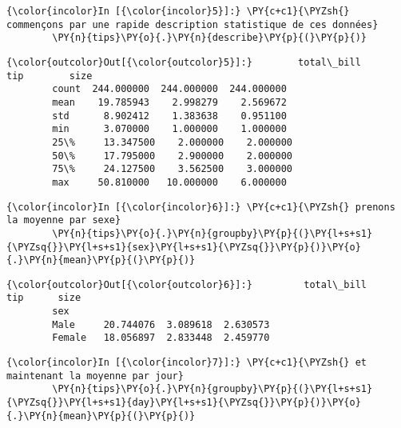     \begin{Verbatim}[commandchars=\\\{\},frame=single,framerule=0.3mm,rulecolor=\color{cellframecolor}]
{\color{incolor}In [{\color{incolor}5}]:} \PY{c+c1}{\PYZsh{} commençons par une rapide description statistique de ces données}
        \PY{n}{tips}\PY{o}{.}\PY{n}{describe}\PY{p}{(}\PY{p}{)}
\end{Verbatim}


\begin{Verbatim}[commandchars=\\\{\},frame=single,framerule=0.3mm,rulecolor=\color{cellframecolor}]
{\color{outcolor}Out[{\color{outcolor}5}]:}        total\_bill         tip        size
        count  244.000000  244.000000  244.000000
        mean    19.785943    2.998279    2.569672
        std      8.902412    1.383638    0.951100
        min      3.070000    1.000000    1.000000
        25\%     13.347500    2.000000    2.000000
        50\%     17.795000    2.900000    2.000000
        75\%     24.127500    3.562500    3.000000
        max     50.810000   10.000000    6.000000
\end{Verbatim}
            
    \begin{Verbatim}[commandchars=\\\{\},frame=single,framerule=0.3mm,rulecolor=\color{cellframecolor}]
{\color{incolor}In [{\color{incolor}6}]:} \PY{c+c1}{\PYZsh{} prenons la moyenne par sexe}
        \PY{n}{tips}\PY{o}{.}\PY{n}{groupby}\PY{p}{(}\PY{l+s+s1}{\PYZsq{}}\PY{l+s+s1}{sex}\PY{l+s+s1}{\PYZsq{}}\PY{p}{)}\PY{o}{.}\PY{n}{mean}\PY{p}{(}\PY{p}{)}
\end{Verbatim}


\begin{Verbatim}[commandchars=\\\{\},frame=single,framerule=0.3mm,rulecolor=\color{cellframecolor}]
{\color{outcolor}Out[{\color{outcolor}6}]:}         total\_bill       tip      size
        sex                                   
        Male     20.744076  3.089618  2.630573
        Female   18.056897  2.833448  2.459770
\end{Verbatim}
            
    \begin{Verbatim}[commandchars=\\\{\},frame=single,framerule=0.3mm,rulecolor=\color{cellframecolor}]
{\color{incolor}In [{\color{incolor}7}]:} \PY{c+c1}{\PYZsh{} et maintenant la moyenne par jour}
        \PY{n}{tips}\PY{o}{.}\PY{n}{groupby}\PY{p}{(}\PY{l+s+s1}{\PYZsq{}}\PY{l+s+s1}{day}\PY{l+s+s1}{\PYZsq{}}\PY{p}{)}\PY{o}{.}\PY{n}{mean}\PY{p}{(}\PY{p}{)}
\end{Verbatim}


